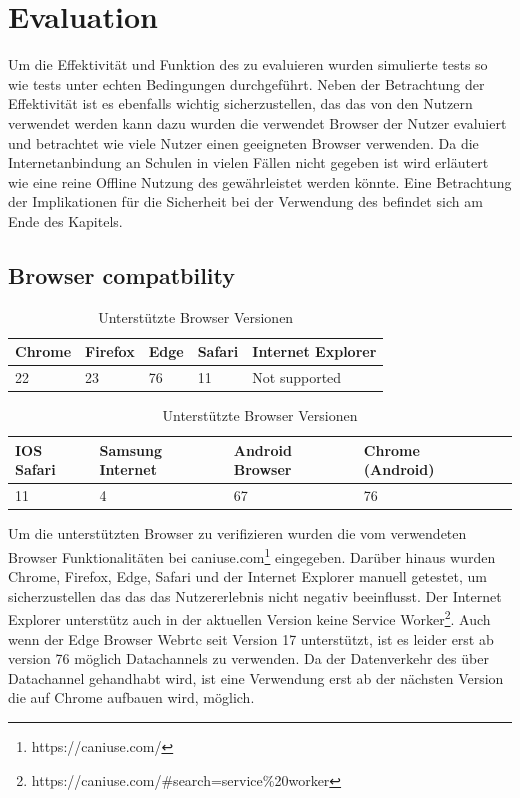 \chapter{Evaluation}\label{ch:evaluation}
Um die Effektivität und Funktion des \cdns zu evaluieren wurden simulierte tests so wie tests unter echten Bedingungen durchgeführt. Neben der Betrachtung der Effektivität ist es ebenfalls wichtig sicherzustellen, das das \cdn von den Nutzern verwendet werden kann dazu wurden die verwendet Browser der Nutzer evaluiert und betrachtet wie viele Nutzer einen geeigneten Browser verwenden. Da die Internetanbindung an Schulen in vielen Fällen nicht gegeben ist wird erläutert wie eine reine Offline Nutzung des \cdns gewährleistet werden könnte. Eine Betrachtung der Implikationen für die Sicherheit bei der Verwendung des \cdns befindet sich am Ende des Kapitels.   
\section{Browser compatbility}
\begin{table}[!htb]
\begin{center}

	\begin{tabular}{|l|l|l|l|l|}
		\hline
		Chrome & Firefox & Edge & Safari & Internet Explorer	  \\ \hline
		22 	   & 23 	  & 76	 & 11	  & Not supported    				\\ \hline
	\end{tabular}
	
	\begin{tabular}{|l|l|l|l|l|}
		\hline
		IOS Safari & Samsung Internet & Android Browser	& Chrome (Android) \\ \hline
		11	   & 4				  & 67				& 76  \\ \hline
	\end{tabular}

	\caption{Unterstützte Browser Versionen}
\end{center}
\end{table}

Um die unterstützten Browser zu verifizieren wurden die vom \pTp \cdn verwendeten Browser Funktionalitäten bei caniuse.com\footnote{https://caniuse.com/} eingegeben. Darüber hinaus wurden Chrome, Firefox, Edge, Safari und der Internet Explorer manuell getestet, um sicherzustellen das das \pTp \cdn das Nutzererlebnis nicht negativ beeinflusst. Der Internet Explorer unterstütz auch in der aktuellen Version keine Service Worker\footnote{https://caniuse.com/#search=service\%20worker}. Auch wenn der Edge Browser Webrtc seit Version 17 unterstützt, ist es leider erst ab version 76 möglich Datachannels zu verwenden. Da der Datenverkehr des \pTp \cdns über Datachannel gehandhabt wird, ist eine Verwendung erst ab der nächsten Version die auf Chrome aufbauen wird, möglich.


